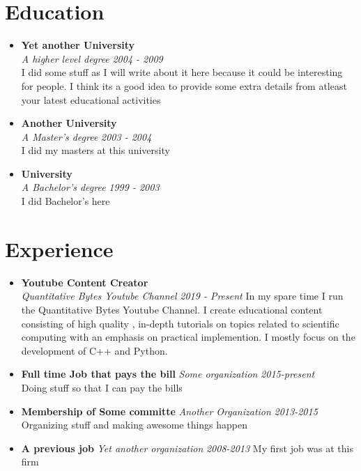 \documentclass[11pt,oneside,a4paper,titlepage]{article}
\begin{document}
\begin{tcolorbox}
\begin{minipage}[t]{11cm}
\begin{tcolorbox}[grow to right by= 0.75cm,colback=white,colframe=white]
		\section*{Education}
		\begin{itemize}
			\item  
			\textbf{Yet another University}\\
			\emph{A higher level degree}
			\emph{2004 - 2009}\\
			I did some stuff as I will write about it here because it could be interesting for people. I think its a good idea to provide some extra details from atleast your latest educational activities
			
			\item 
			\textbf{Another University}\\
			\emph{A Master's degree}
			\emph{2003 - 2004}\\
			I did my masters at this university
			
			\item
			\textbf{University}\\
			\emph{A Bachelor's degree}
			\emph{1999 - 2003}\\
			I did Bachelor's here	
		\end{itemize}
		
		\section*{Experience}
		\begin{itemize}
			\item
			\textbf{Youtube Content Creator}\\
			\emph{Quantitative Bytes Youtube Channel}
			\emph{2019 - Present}
			In my spare time I run the Quantitative Bytes Youtube Channel. I create educational content consisting of high quality , in-depth tutorials on topics related to scientific computing with an emphasis on practical implemention. I mostly focus on the development of C++ and Python.
			
			\item 
			\textbf{Full time Job that pays the bill}
			\emph{Some organization}
			\emph{2015-present}\\
			Doing stuff so that I can pay the bills
			
			\item 
			\textbf{Membership of Some committe}
			\emph{Another Organization}
			\emph{2013-2015}
			Organizing stuff and making awesome things happen
			
			\item 
			\textbf{A previous job}
			\emph{Yet another organization}
			\emph{2008-2013}
			My first job was at this firm
		\end{itemize}
		\end{tcolorbox}
	\end{minipage}
\end{tcolorbox}
\end{document}

